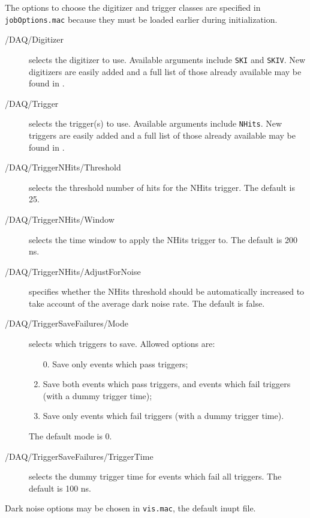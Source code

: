 The options to choose the digitizer and trigger classes are specified in \texttt{jobOptions.mac} because they must be loaded earlier during initialization.
\begin{description}
\item[/DAQ/Digitizer] selects the digitizer to use. Available arguments include \texttt{SKI} and \texttt{SKIV}. New digitizers are easily added and a full list of those already available may be found in .
\item[/DAQ/Trigger] selects the trigger(s) to use. Available arguments include \texttt{NHits}. New triggers are easily added and a full list of those already available may be found in .
\item[/DAQ/TriggerNHits/Threshold] selects the threshold number of hits for the NHits trigger. The default is 25.
\item[/DAQ/TriggerNHits/Window] selects the time window to apply the NHits trigger to. The default is 200 ns.
\item[/DAQ/TriggerNHits/AdjustForNoise] specifies whether the NHits threshold should be automatically increased to take account of the average dark noise rate. The default is false.
\item[/DAQ/TriggerSaveFailures/Mode] selects which triggers to save. Allowed options are:
  \begin{enumerate}
  \item [0.]\setcounter{enumi}{0} Save only events which pass triggers;
  \item Save both events which pass triggers, and events which fail triggers (with a dummy trigger time);
  \item Save only events which fail triggers (with a dummy trigger time).
  \end{enumerate}
The default mode is 0.
\item[/DAQ/TriggerSaveFailures/TriggerTime] selects the dummy trigger time for events which fail all triggers. The default is 100 ns.
\end{description}
Dark noise options may be chosen in \texttt{vis.mac}, the default inupt file.
